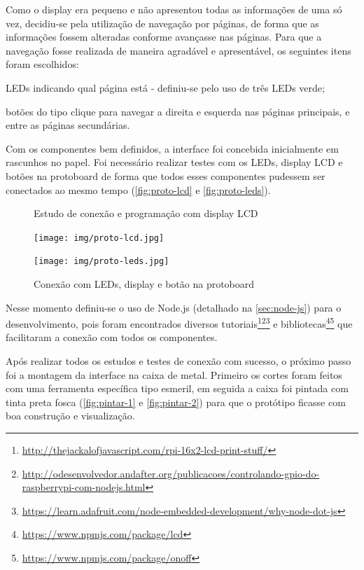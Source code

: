Como o display era pequeno e não apresentou todas as informações de uma só vez, decidiu-se pela utilização de navegação por páginas, de forma que as informações fossem alteradas conforme avançasse nas páginas. Para que a navegação fosse realizada de maneira agradável e apresentável, os seguintes itens foram escolhidos:

\begin{alineas}
	\item LEDs indicando qual página está - definiu-se pelo uso de três LEDs verde;
	\item botões do tipo clique para navegar a direita e esquerda nas páginas principais, e entre as páginas secundárias.
\end{alineas}

Com os componentes bem definidos, a interface foi concebida inicialmente em rascunhos no papel. Foi necessário realizar testes com os LEDs, display LCD e botões na protoboard de forma que todos esses componentes pudessem ser conectados ao mesmo tempo (\autoref{fig:proto-lcd} e \autoref{fig:proto-leds}). 

\begin{figure}[htb]
	\centering
 	\begin{minipage}{0.47\textwidth}
		\centering
		\caption{\label{fig:proto-lcd}Estudo de conexão e programação com display LCD}
		\texttt{[image: img/proto-lcd.jpg]}
	\end{minipage}
	\hfill
	\begin{minipage}{0.47\textwidth}
		\centering
		\caption{\label{fig:proto-leds}Conexão com LEDs, display e botão na protoboard}
		\texttt{[image: img/proto-leds.jpg]}
	\end{minipage}
\end{figure}

Nesse momento definiu-se o uso de Node.js (detalhado na \autoref{sec:node-js}) para o desenvolvimento, pois foram encontrados diversos tutoriais\footnote{\url{http://thejackalofjavascript.com/rpi-16x2-lcd-print-stuff/}}\footnote{\url{http://odesenvolvedor.andafter.org/publicacoes/controlando-gpio-do-raspberrypi-com-nodejs.html}}\footnote{\url{https://learn.adafruit.com/node-embedded-development/why-node-dot-js}} e bibliotecas\footnote{\url{https://www.npmjs.com/package/lcd}}\footnote{\url{https://www.npmjs.com/package/onoff}} que facilitaram a conexão com todos os componentes.

Após realizar todos os estudos e testes de conexão com sucesso, o próximo passo foi a montagem da interface na caixa de metal. Primeiro os cortes foram feitos com uma ferramenta específica tipo esmeril, em seguida a caixa foi pintada com tinta preta fosca (\autoref{fig:pintar-1} e \autoref{fig:pintar-2}) para que o protótipo ficasse com boa construção e visualização.

